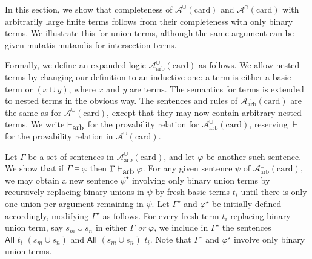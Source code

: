 \documentclass[letterpaper]{article}
\theoremstyle{definition}
\newcommand{\proves}{\vdash}
\newcommand{\Aunion}{\mathscr{A}^{\cup}}
\newcommand{\Ainter}{\mathscr{A}^{\cap}}
\newcommand{\All}[2]{\mathsf{All}\,\,#1\,\,#2}
\newcommand{\card}{\mathrm{card}}
\newcommand{\provesarbitrary}{\proves_{\mbox{\small{arb}}}}
\begin{document}
In this section, we show that completeness of $\Aunion(\card)$ and $\Ainter(\card)$ with arbitrarily large finite terms follows from their completeness with only binary terms.  We illustrate this for union terms, although the same argument can be given mutatis mutandis for intersection terms.

Formally, we define an expanded logic $\Aunion_\mathrm{arb}(\card)$ as follows. We allow nested terms by changing our definition to an inductive one: a term is either a basic term or $(x\cup y)$, where $x$ and $y$ are terms. The semantics for terms is extended to nested terms in the obvious way. The sentences and rules of $\Aunion_\mathrm{arb}(\card)$ are the same as for $\Aunion(\card)$, except that they may now contain arbitrary nested terms.  We write $\provesarbitrary$ for the provability relation for $\Aunion_\mathrm{arb}(\card)$, reserving $\proves$ for the provability relation in $\Aunion(\card)$.

Let $\Gamma$ be a set of sentences in $\Aunion_\mathrm{arb}(\card)$, and let $\varphi$ be another such sentence.  We show that if $\Gamma \models \varphi$ then $\Gamma \provesarbitrary \varphi$. For any given sentence $\psi$ of $\Aunion_\mathrm{arb}(\card)$, we may obtain a new sentence $\psi^\star$ involving only binary union terms by recursively replacing binary unions in $\psi$ by fresh basic terms $t_i$ until there is only one union per argument remaining in $\psi$.  
Let $\Gamma^\star$ and $\varphi^\star$ be initially defined accordingly, modifying $\Gamma^\star$ as follows.  For every fresh term $t_i$ replacing binary union term, say $s_m \cup s_n$ in either $\Gamma$ \emph{or} $\varphi$, we include in $\Gamma^\star$ the sentences $\All{t_i}{(s_m \cup s_n)}$ and $\All{(s_m \cup s_n)}{t_i}$.  Note that $\Gamma^\star$ and $\varphi^\star$ involve only binary union terms.
\end{document}
